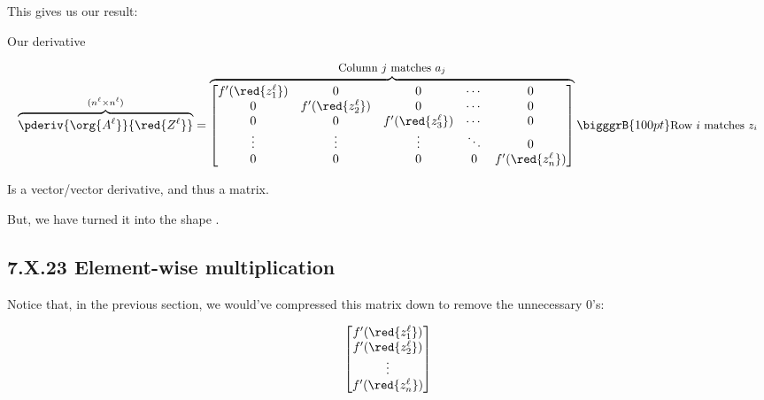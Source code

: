         This gives us our result:\\

        \begin{notation}
            Our derivative
            
            \begin{equation}
                \overbrace{
                    \pderiv {\org{A^\ell}}   {\red{Z^\ell}}
                }^{ (n^{\ell} \times n^{\ell}) }
                =
                \overbrace{
                    \begin{bmatrix}
                        f'({\red{z_1^\ell}})&0                   &0                   &\cdots  & 0 \\
                        0                   &f'({\red{z_2^\ell}})&0                   &\cdots  & 0 \\
                        0                   &0                   &f'({\red{z_3^\ell}})&\cdots  & 0 \\
                        \vdots              &\vdots              &\vdots              &\ddots  & 0 \\
                        0                   &0                   &0                   &0   &f'({\red{z_n^\ell}})
                    \end{bmatrix}
                }^{ \text{\small Column $j$ matches $a_j$} }
                \bigggrB{100pt} \text{\small Row $i$ matches $z_i$} 
            \end{equation}
        
            Is a vector/vector derivative, and thus a matrix.
            
            But, we have turned it into the shape .
        \end{notation}
    
    
    \subsection*{7.X.23 \quad Element-wise multiplication}

        Notice that, in the previous section, we would've compressed this matrix down to remove the unnecessary 0's:
        
        \begin{equation}
            \begin{bmatrix}
                f'({\red{z_1^\ell}})\\
                f'({\red{z_2^\ell}})\\
                \vdots \\
                f'({\red{z_n^\ell}})
            \end{bmatrix}
        \end{equation}
        
